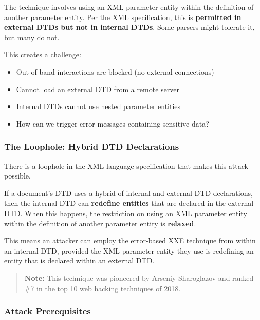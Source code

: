 \documentclass{article}
\begin{document}
\begin{warningbox}
The technique involves using an XML parameter entity within the definition of another parameter entity. Per the XML specification, this is \textbf{permitted in external DTDs but not in internal DTDs}. Some parsers might tolerate it, but many do not.
\end{warningbox}

This creates a challenge:
\begin{itemize}
    \item Out-of-band interactions are blocked (no external connections)
    \item Cannot load an external DTD from a remote server
    \item Internal DTDs cannot use nested parameter entities
    \item How can we trigger error messages containing sensitive data?
\end{itemize}

\subsubsection{The Loophole: Hybrid DTD Declarations}

There is a loophole in the XML language specification that makes this attack possible. 

\begin{infobox}
If a document's DTD uses a hybrid of internal and external DTD declarations, then the internal DTD can \textbf{redefine entities} that are declared in the external DTD. When this happens, the restriction on using an XML parameter entity within the definition of another parameter entity is \textbf{relaxed}.
\end{infobox}

This means an attacker can employ the error-based XXE technique from within an internal DTD, provided the XML parameter entity they use is redefining an entity that is declared within an external DTD.


\begin{quote}
\textbf{Note:} This technique was pioneered by Arseniy Sharoglazov and ranked \#7 in the top 10 web hacking techniques of 2018.
\end{quote}

\subsubsection{Attack Prerequisites}
\end{document}
